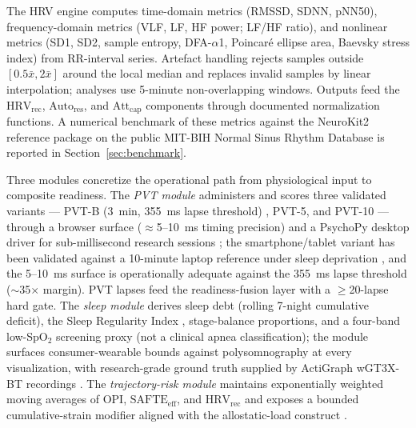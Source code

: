 \documentclass[10pt,journal,twocolumn,compsoc]{IEEEtran}
\begin{document}
The HRV engine computes time-domain metrics (RMSSD, SDNN, pNN50), frequency-domain metrics (VLF, LF, HF power; LF/HF ratio), and nonlinear metrics (SD1, SD2, sample entropy, DFA-$\alpha$1, Poincar\'e ellipse area, Baevsky stress index) from RR-interval series. Artefact handling rejects samples outside $[0.5\bar{x}, 2\bar{x}]$ around the local median and replaces invalid samples by linear interpolation; analyses use 5-minute non-overlapping windows. Outputs feed the $\mathrm{HRV_{rec}}$, $\mathrm{Auto_{res}}$, and $\mathrm{Att_{cap}}$ components through documented normalization functions. A numerical benchmark of these metrics against the NeuroKit2 reference package \cite{makowski2021} on the public MIT-BIH Normal Sinus Rhythm Database \cite{goldberger2000} is reported in Section~\ref{sec:benchmark}.

Three modules concretize the operational path from physiological input to composite readiness. The \emph{PVT module} administers and scores three validated variants --- PVT-B (3~min, 355~ms lapse threshold) \cite{basner2011}, PVT-5, and PVT-10 \cite{dinges1997} --- through a browser surface ($\approx$5--10~ms timing precision) \cite{anwylirvine2020} and a PsychoPy desktop driver for sub-millisecond research sessions \cite{garaizar2014}; the smartphone/tablet variant has been validated against a 10-minute laptop reference under sleep deprivation \cite{grant2017}, and the 5--10~ms surface is operationally adequate against the 355~ms lapse threshold ($\sim$35$\times$ margin). PVT lapses feed the readiness-fusion layer with a $\geq$20-lapse hard gate. The \emph{sleep module} derives sleep debt (rolling 7-night cumulative deficit), the Sleep Regularity Index \cite{lunsfordavery2018}, stage-balance proportions, and a four-band low-SpO$_2$ screening proxy (not a clinical apnea classification); the module surfaces consumer-wearable bounds against polysomnography \cite{lee2025,schyvens2024} at every visualization, with research-grade ground truth supplied by ActiGraph wGT3X-BT recordings \cite{buchan2024}. The \emph{trajectory-risk module} maintains exponentially weighted moving averages of OPI, $\mathrm{SAFTE_{eff}}$, and $\mathrm{HRV_{rec}}$ and exposes a bounded cumulative-strain modifier aligned with the allostatic-load construct \cite{mcewen1998}.
\end{document}
